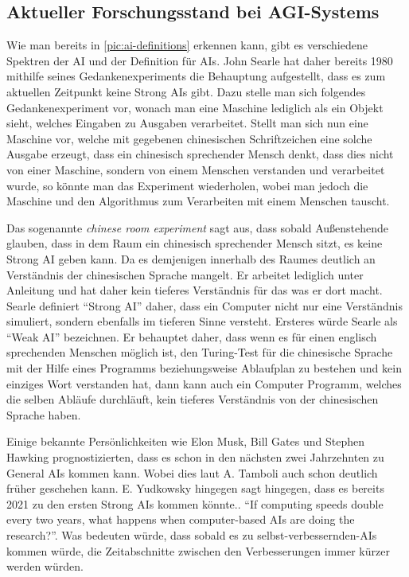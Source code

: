         \subsection{Aktueller Forschungsstand bei AGI-Systems}
            Wie man bereits in \ref{pic:ai-definitions} erkennen kann, gibt es verschiedene Spektren der AI und der
            Definition für AIs. John Searle hat daher bereits 1980 mithilfe seines Gedankenexperiments die Behauptung
            aufgestellt, dass es zum aktuellen Zeitpunkt keine Strong AIs gibt. Dazu stelle man sich folgendes
            Gedankenexperiment vor, wonach man eine Maschine lediglich als ein Objekt sieht, welches Eingaben zu
            Ausgaben verarbeitet. \cite{cole_2014} Stellt man sich nun eine Maschine vor, welche mit gegebenen
            chinesischen Schriftzeichen eine solche Ausgabe erzeugt, dass ein chinesisch sprechender Mensch denkt,
            dass dies nicht von einer Maschine, sondern von einem Menschen verstanden und verarbeitet wurde, so könnte
            man das Experiment wiederholen, wobei man jedoch die Maschine und den Algorithmus zum Verarbeiten mit einem
            Menschen tauscht.

            Das sogenannte \textit{chinese room experiment} sagt aus, dass sobald Außenstehende glauben,
            dass in dem Raum ein chinesisch sprechender Mensch sitzt, es keine Strong AI geben kann. Da es demjenigen
            innerhalb des Raumes deutlich an Verständnis der chinesischen Sprache mangelt. Er arbeitet lediglich unter
            Anleitung und hat daher kein tieferes Verständnis für das was er dort macht. Searle definiert
            ``Strong AI'' daher, dass ein Computer nicht nur eine Verständnis simuliert, sondern ebenfalls im tieferen
            Sinne versteht. Ersteres würde Searle als ``Weak AI'' bezeichnen. \cite{cole_2014} Er behauptet daher, dass
            wenn es für einen englisch sprechenden Menschen möglich ist, den Turing-Test für die chinesische Sprache mit
            der Hilfe eines Programms beziehungsweise Ablaufplan zu bestehen und kein einziges Wort verstanden hat, dann
            kann auch ein Computer Programm, welches die selben Abläufe durchläuft, kein tieferes Verständnis von der
            chinesischen Sprache haben.\cite{cole_2014}

            Einige bekannte Persönlichkeiten wie Elon Musk, Bill Gates und Stephen Hawking prognostizierten, dass es
            schon in den nächsten zwei Jahrzehnten zu General AIs kommen kann. \cite[p. 20]{Tamboli2019} Wobei dies laut
            A. Tamboli auch schon deutlich früher geschehen kann. E. Yudkowsky hingegen sagt hingegen, dass es bereits
            2021 zu den ersten Strong AIs kommen könnte.\cite{yudkowsky_2001}. ``If computing speeds double every
            two years, what happens when computer-based AIs are doing the research?''. Was bedeuten würde, dass sobald
            es zu selbst-verbessernden-AIs kommen würde, die Zeitabschnitte zwischen den Verbesserungen immer kürzer
            werden würden.

